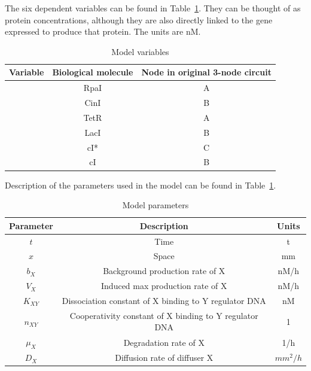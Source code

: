 The six dependent variables can be found in Table~\ref{tab:Model variables}.
They can be thought of as protein concentrations, although they are also directly linked to the gene expressed to produce that protein.
The units are nM.
\begin{table}[H]
    \centering
    \caption{Model variables}
    \label{tab:Model variables}
    \renewcommand{\arraystretch}{1.3} %
    \begin{tabular}{|c|c|c|}
        \hline
        \textbf{Variable} & \textbf{Biological molecule} & \textbf{Node in original 3-node circuit}\\
        \hline
        [A] & RpaI & A\\
        \hline
        [B] & CinI & B \\
        \hline
        [C] & TetR & A\\
        \hline
        [D] & LacI & B \\
        \hline
        [E] & cI* & C \\
        \hline
        [F] & cI & B \\
        \hline
    \end{tabular}
\end{table}
Description of the parameters used in the model can be found in Table~\ref{tab:Model variables}.

\begin{table}[H]
    \centering
    \caption{Model parameters}
    \label{tab:variables}
    \renewcommand{\arraystretch}{1.3} %
    \begin{tabular}{|c|c|c|}
        \hline
        \textbf{Parameter} & \textbf{Description} & Units\\
        \hline
        $t$ & Time & t\\
        \hline
        $x$ & Space & mm\\
        \hline
        $b_{X}$ & Background production rate of X & nM/h\\
        \hline
        $V_{X}$ & Induced max production rate of X & nM/h \\
        \hline
        $K_{XY}$ & Dissociation constant of X binding to Y regulator DNA & nM \\
        \hline
        $n_{XY}$ & Cooperativity constant of X binding to Y regulator DNA & 1\\
        \hline
        $\mu_{X}$ & Degradation rate of X & 1/h\\
        \hline
        $D_{X}$ & Diffusion rate of diffuser X & $mm^2/h$\\
        \hline

    \end{tabular}
\end{table}

